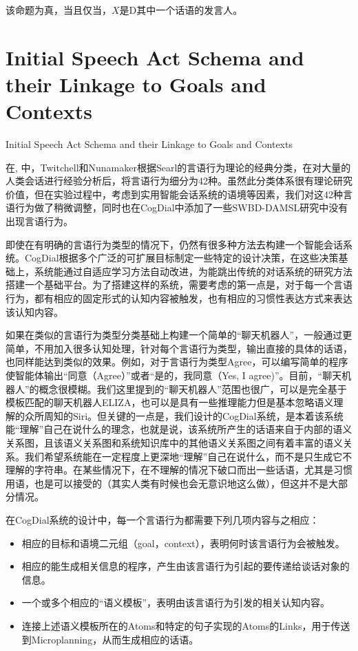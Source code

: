 该命题为真，当且仅当，$X是$D其中一个话语的发言人。


\section{Initial Speech Act Schema and their Linkage to Goals and Contexts}{Initial Speech Act Schema and their Linkage to Goals and Contexts}

在\cite{Twitchell2004}, 中，Twitchell和Nunamaker根据Searl的言语行为理论的经典分类，在对大量的人类会话进行经验分析后，将言语行为细分为42种。虽然此分类体系很有理论研究价值，但在实验过程中，考虑到实用智能会话系统的语境等因素，我们对这42种言语行为做了稍微调整，同时也在CogDial中添加了一些SWBD-DAMSL研究中没有出现言语行为。

即使在有明确的言语行为类型的情况下，仍然有很多种方法去构建一个智能会话系统。CogDial根据多个广泛的可扩展目标制定一些特定的设计决策，在这些决策基础上，系统能通过自适应学习方法自动改进，为能跳出传统的对话系统的研究方法搭建一个基础平台。为了搭建这样的系统，需要考虑的第一点是，对于每一个言语行为，都有相应的固定形式的认知内容被触发，也有相应的习惯性表达方式来表达该认知内容。

如果在类似的言语行为类型分类基础上构建一个简单的“聊天机器人”，一般通过更简单，不用加入很多认知处理，针对每个言语行为类型，输出直接的具体的话语，也同样能达到类似的效果。例如，对于言语行为类型Agree，可以编写简单的程序使智能体输出“同意（Agree）”或者“是的，我同意（Yes, I agree)”。目前，“聊天机器人”的概念很模糊。我们这里提到的“聊天机器人”范围也很广，可以是完全基于模板匹配的聊天机器人ELIZA\cite{Weizenbaum1966}，也可以是具有一些推理能力但是基本忽略语义理解的众所周知的Siri。但关键的一点是，我们设计的CogDial系统，是本着该系统能“理解”自己在说什么的理念，也就是说，该系统所产生的话语来自于内部的语义关系图，且该语义关系图和系统知识库中的其他语义关系图之间有着丰富的语义关系。我们希望系统能在一定程度上更深地“理解”自己在说什么，而不是只生成它不理解的字符串。在某些情况下，在不理解的情况下破口而出一些话语，尤其是习惯用语，也是可以接受的（其实人类有时候也会无意识地这么做），但这并不是大部分情况。

在CogDial系统的设计中，每一个言语行为都需要下列几项内容与之相应：
\begin{itemize}
\item 相应的目标和语境二元组（goal，context），表明何时该言语行为会被触发。
\item 相应的能生成相关信息的程序，产生由该言语行为引起的要传递给谈话对象的信息。
\item 一个或多个相应的“语义模板”，表明由该言语行为引发的相关认知内容。
\item 连接上述语义模板所在的Atoms和特定的句子实现的Atoms的Links，用于传送到Microplanning，从而生成相应的话语。
\end{itemize}

